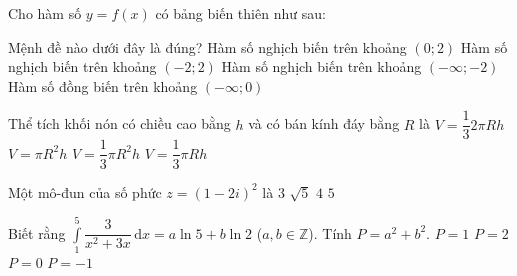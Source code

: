 \begin{ex}%
Cho hàm số $y = f(x)$ có bảng biến thiên như sau:

\begin{center}
\end{center}

Mệnh đề nào dưới đây là đúng?
\choice
{\True Hàm số nghịch biến trên khoảng $(0; 2)$}
{Hàm số nghịch biến trên khoảng $(-2; 2)$}
{Hàm số nghịch biến trên khoảng $(-\infty; -2)$}
{Hàm số đồng biến trên khoảng $(-\infty; 0)$}
\end{ex}


\begin{ex}%
Thể tích khối nón có chiều cao bằng $h$ và có bán kính đáy bằng $R$ là
\choice
{$V = \dfrac{1}{3}2\pi Rh$}
{$V = \pi R^2 h$}
{\True $V = \dfrac{1}{3} \pi R^2 h$}
{$V = \dfrac{1}{3} \pi R h$}
\end{ex}


\begin{ex}%
Một mô-đun của số phức $z = (1 - 2i)^2$ là
\choice
{$3$}
{$\sqrt{5}$}
{$4$}
{\True $5$}
\end{ex}


\begin{ex}%
Biết rằng $\displaystyle \int\limits_1^5 \dfrac{3}{x^2 + 3x}\, \mathrm{d} x = a \ln 5 + b \ln 2$ ($a, b \in \mathbb{Z}$). Tính $P = a^2 + b^2$.
\choice
{$P = 1$}
{\True $P = 2$}
{$P = 0$}
{$P = -1$}
\end{ex}


